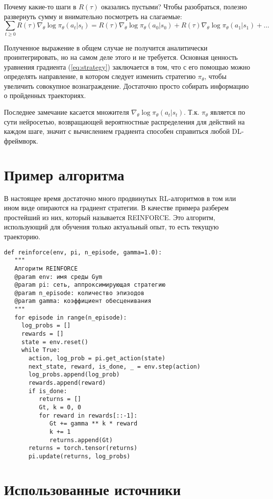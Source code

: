 \documentclass[a4paper,12pt]{article}
\numberwithin{equation}{section}
\begin{document}
Почему какие-то шаги в $R(\tau)$ оказались пустыми? Чтобы разобраться, полезно развернуть сумму и внимательно посмотреть на слагаемые: 
\[
	\sum_{t \ge 0} R(\tau) \nabla_\theta  \log \pi_\theta (a_t | s_t) = R(\tau) \nabla_\theta  \log \pi_\theta (a_0 | s_0) + R(\tau) \nabla_\theta  \log \pi_\theta (a_1 | s_1) + \ldots
\]




Полученное выражение в общем случае не получится аналитически проинтегрировать, но на самом деле этого и не требуется. Основная ценность уравнения градиента (\ref{eq:strategy}) заключается в том, что с его помощью можно определять направление, в котором следует изменить стратегию $\pi_\theta$, чтобы увеличить совокупное вознаграждение. Достаточно просто собирать информацию о пройденных траекториях.

Последнее замечание касается множителя $\nabla_\theta  \log \pi_\theta (a_t | s_t)$. Т.к. $\pi_\theta$ является по сути нейросетью, возвращающей вероятностные распределения для действий на каждом шаге, значит с вычислением градиента способен справиться любой DL-фреймворк. 


\section{Пример алгоритма}

В настоящее время достаточно много продвинутых RL-алгоритмов в том или ином виде опираются на градиент стратегии. В качестве примера разберем простейший из них, который называется REINFORCE. Это алгоритм, использующий для обучения только актуальный опыт, то есть текущую траекторию. 

\begin{verbatim}
def reinforce(env, pi, n_episode, gamma=1.0):
   """
   Алгоритм REINFORCE
   @param env: имя среды Gym
   @param pi: сеть, аппроксимирующая стратегию
   @param n_episode: количество эпизодов
   @param gamma: коэффициент обесценивания
   """
   for episode in range(n_episode):
     log_probs = []
     rewards = []
     state = env.reset()
     while True:
       action, log_prob = pi.get_action(state)
       next_state, reward, is_done, _ = env.step(action)
       log_probs.append(log_prob)
       rewards.append(reward)
       if is_done:
          returns = []
          Gt, k = 0, 0
          for reward in rewards[::-1]:
             Gt += gamma ** k * reward
             k += 1
             returns.append(Gt)
       returns = torch.tensor(returns)			
       pi.update(returns, log_probs)
\end{verbatim}

\section{Использованные источники}
\end{document}
